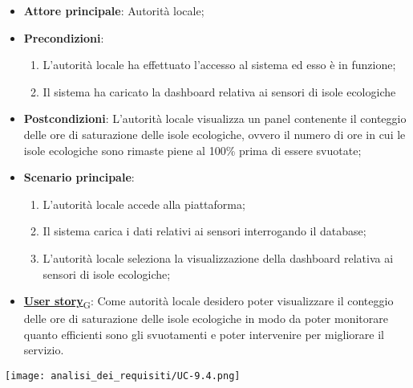 \begin{itemize}
	\item \textbf{Attore principale}: Autorità locale;
	\item \textbf{Precondizioni}:
	      \begin{enumerate}
		      \item L'autorità locale ha effettuato l'accesso al sistema ed esso è in funzione;
		      \item Il sistema ha caricato la dashboard relativa ai sensori di isole ecologiche
	      \end{enumerate}
	\item \textbf{Postcondizioni}: L'autorità locale visualizza un panel contenente il conteggio delle ore di saturazione delle isole ecologiche,
	      ovvero il numero di ore in cui le isole ecologiche sono rimaste piene al 100\% prima di essere svuotate;
	\item \textbf{Scenario principale}:
	      \begin{enumerate}
		      \item L'autorità locale accede alla piattaforma;
		      \item Il sistema carica i dati relativi ai sensori interrogando il database;
		      \item L'autorità locale seleziona la visualizzazione della dashboard relativa ai sensori di isole ecologiche;
	      \end{enumerate}
	\item \href{https://7last.github.io/docs/rtb/documentazione-interna/glossario\#user-story}{\textbf{User story}\textsubscript{G}}:
	      Come autorità locale desidero poter visualizzare il conteggio delle ore di saturazione delle isole ecologiche in modo da poter monitorare
	      quanto efficienti sono gli svuotamenti e poter intervenire per migliorare il servizio.
\end{itemize}
\begin{center}
	\texttt{[image: analisi\_dei\_requisiti/UC-9.4.png]}
\end{center}

